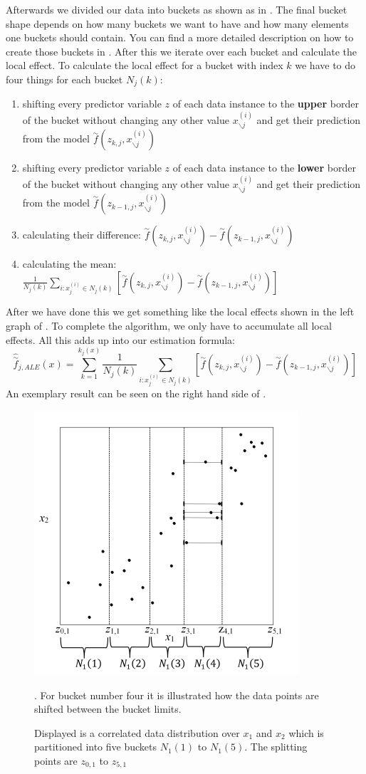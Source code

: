 \documentclass[11pt,
  a4paper,
  parskip=half, %
  BCOR=10mm, %
  english,
  ]{article}
\begin{document}
Afterwards we divided our data into buckets as shown as in . The final bucket shape depends on how many buckets we want to have and how many 
elements one buckets should contain. You can find a more detailed description on how to create those buckets in . 
After this we iterate over each bucket and calculate the local effect. To calculate the local effect for a bucket with index $k$ we have to do four things for each bucket $N_j(k)$: 
\begin{enumerate}
    \item shifting every predictor variable $z$ of each data instance to the \textbf{upper} border of the bucket without changing any other value $x_{\backslash j}^{(i)}$ and get their prediction from the model  $\overset{\sim}{f}(z_{k, j}, x_{\backslash j}^{(i)}) $
    \item shifting every predictor variable $z$ of each data instance to the \textbf{lower} border of the bucket without changing any other value $x_{\backslash j}^{(i)}$ and get their prediction from the model  $\overset{\sim}{f}(z_{k-1, j}, x_{\backslash j}^{(i)})$
    \item calculating their difference:  $\overset{\sim}{f}(z_{k, j}, x_{\backslash j}^{(i)}) - \overset{\sim}{f}(z_{k-1, j}, x_{\backslash j}^{(i)})$ 
    \item calculating the mean: $\frac{1}{N_j(k)} \sum_{i:x_j^{(i)} \in N_j(k)}\left[ \overset{\sim}{f}(z_{k, j}, x_{\backslash j}^{(i)}) - \overset{\sim}{f}(z_{k-1, j}, x_{\backslash j}^{(i)})\right]$
\end{enumerate}
After we have done this we get something like the local effects shown in the left graph of . To complete the algorithm, we only have to accumulate all local effects. All this adds up into our estimation formula: \cite{molnar2022}
\begin{equation} \label{eqn:ALE-Estimation}
    \hat{\overset{\sim}{f}}_{j, ALE}(x) = \sum_{k = 1}^{k_j(x)} \frac{1}{N_j(k)} \sum_{i:x_j^{(i)} \in N_j(k)}\left[ \overset{\sim}{f}(z_{k, j}, x_{\backslash j}^{(i)}) - \overset{\sim}{f}(z_{k-1, j}, x_{\backslash j}^{(i)})\right]
\end{equation}
An exemplary result can be seen on the right hand side of . 

\begin{figure}
    \centering
    \includegraphics[width=0.3 \linewidth]{images/1DBuckets.png}
    \caption{Displayed is a correlated data distribution over $x_1$ and $x_2$ which is partitioned into five buckets $N_1(1)$ to $N_1(5)$. The splitting points are $z_{0,1}$ to $z_{5,1}$}. For bucket number four it is illustrated how the data points are shifted between the bucket limits.
    \label{fig:1dbuckets}
\end{figure}
\end{document}
